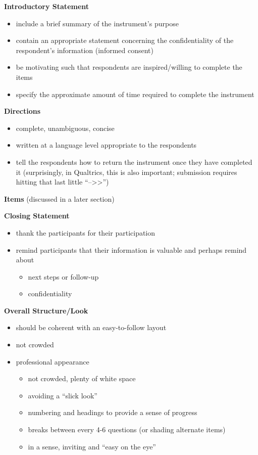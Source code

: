 \documentclass[
  english,
]{book}
\providecommand{\tightlist}{%
  \setlength{\itemsep}{0pt}\setlength{\parskip}{0pt}}
\begin{document}
\textbf{Introductory Statement}

\begin{itemize}
\tightlist
\item
  include a brief summary of the instrument's purpose
\item
  contain an appropriate statement concerning the confidentiality of the respondent's information (informed consent)
\item
  be motivating such that respondents are inspired/willing to complete the items
\item
  specify the approximate amount of time required to complete the instrument
\end{itemize}

\textbf{Directions}

\begin{itemize}
\tightlist
\item
  complete, unambiguous, concise
\item
  written at a language level appropriate to the respondents
\item
  tell the respondents how to return the instrument once they have completed it (surprisingly, in Qualtrics, this is also important; submission requires hitting that last little ``--\textgreater\textgreater{}'')
\end{itemize}

\textbf{Items} (discussed in a later section)

\textbf{Closing Statement}

\begin{itemize}
\tightlist
\item
  thank the participants for their participation
\item
  remind participants that their information is valuable and perhaps remind about

  \begin{itemize}
  \tightlist
  \item
    next steps or follow-up
  \item
    confidentiality
  \end{itemize}
\end{itemize}

\textbf{Overall Structure/Look}

\begin{itemize}
\tightlist
\item
  should be coherent with an easy-to-follow layout
\item
  not crowded
\item
  professional appearance

  \begin{itemize}
  \tightlist
  \item
    not crowded, plenty of white space
  \item
    avoiding a ``slick look''
  \item
    numbering and headings to provide a sense of progress
  \item
    breaks between every 4-6 questions (or shading alternate items)
  \item
    in a sense, inviting and ``easy on the eye''
  \end{itemize}
\end{itemize}
\end{document}
